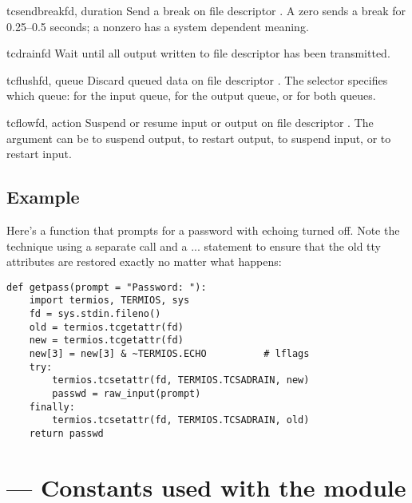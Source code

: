 \begin{funcdesc}{tcsendbreak}{fd, duration}
Send a break on file descriptor .  A zero  sends
a break for 0.25--0.5 seconds; a nonzero  has a system
dependent meaning.
\end{funcdesc}

\begin{funcdesc}{tcdrain}{fd}
Wait until all output written to file descriptor  has been
transmitted.
\end{funcdesc}

\begin{funcdesc}{tcflush}{fd, queue}
Discard queued data on file descriptor .  The 
selector specifies which queue:  for the
input queue,  for the output queue, or
 for both queues.
\end{funcdesc}

\begin{funcdesc}{tcflow}{fd, action}
Suspend or resume input or output on file descriptor .  The
 argument can be  to suspend
output,  to restart output,
 to suspend input, or
 to restart input. 
\end{funcdesc}

\subsection{Example}

Here's a function that prompts for a password with echoing turned
off.  Note the technique using a separate  call
and a  ...  statement to ensure that the
old tty attributes are restored exactly no matter what happens:

\begin{verbatim}
def getpass(prompt = "Password: "):
    import termios, TERMIOS, sys
    fd = sys.stdin.fileno()
    old = termios.tcgetattr(fd)
    new = termios.tcgetattr(fd)
    new[3] = new[3] & ~TERMIOS.ECHO          # lflags
    try:
        termios.tcsetattr(fd, TERMIOS.TCSADRAIN, new)
        passwd = raw_input(prompt)
    finally:
        termios.tcsetattr(fd, TERMIOS.TCSADRAIN, old)
    return passwd
\end{verbatim}


\section{ ---
         Constants used with the  module}


